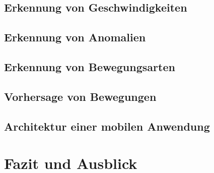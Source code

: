\documentclass{hsflensburg}
\begin{document}
  \subsection{Erkennung von Geschwindigkeiten}
  \subsection{Erkennung von Anomalien}
  \subsection{Erkennung von Bewegungsarten}
  \subsection{Vorhersage von Bewegungen}
  \subsection{Architektur einer mobilen Anwendung}

  \section{Fazit und Ausblick}
\end{document}
